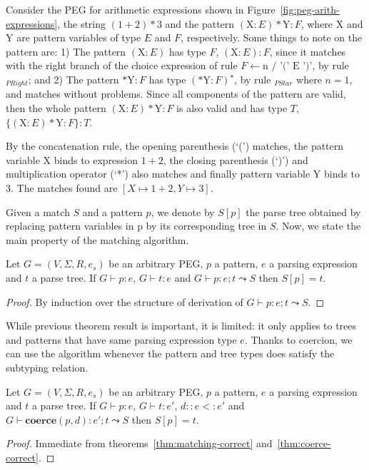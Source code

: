 \begin{example}
  Consider the PEG for arithmetic expressions shown in Figure~\ref{fig:peg-arith-expressions}, 
  the string \((1+2)*3\) and the pattern \((\text{X}:E)*\text{Y}:F\), where X 
  and Y are pattern variables of type \(E\) and \(F\), respectively. 
  Some things to note on the pattern are: 
  1) The pattern \((\text{X}:E)\) has type \(F\), \((\text{X}:E):F\), since it 
  matches with the right branch of the choice expression of rule 
  \(F \leftarrow \text{n / '(' E ')'}\), by rule \(_{PRight}\); and
  2) The pattern \(* \text{Y}:F\) has type \((* \text{Y}:F)^\star\), by rule 
  \(_{PStar}\) where \(n = 1\), and matches without problems.
  Since all components of the pattern are valid, then the whole pattern 
  \((\text{X}:E)*\text{Y}:F\) is also valid and has type \(T\),
  \(\{(\text{X}:E)*\text{Y}:F\}:T\).

  By the concatenation rule, the opening parenthesis (`(') matches, the pattern 
  variable X binds to expression \(1+2\), the closing parenthesis (`)') and 
  multiplication operator (`*') also matches and finally pattern variable Y 
  binds to \(3\).
  The matches found are \([X \mapsto 1+2, Y \mapsto 3]\).
\end{example}

Given a match $S$ and a pattern $p$, we denote by $S[p]$ the parse tree
obtained by replacing pattern variables in p by its corresponding tree
in $S$. Now, we state the main property of the matching algorithm.

\begin{theorem}\label{thm:matching-correct}
  Let $G = (V,\Sigma,R, e_s)$ be an arbitrary PEG, $p$ a pattern,
  $e$ a parsing expression and $t$ a parse tree. If $G \vdash p : e$, $G \vdash t : e$ and
  $G\vdash p : e ; t \leadsto S$ then $S[p] = t$.
\end{theorem}
\begin{proof}
  By induction over the structure of derivation of $G\vdash p : e ; t \leadsto S$.
\end{proof}

While previous theorem result is important, it is limited: it only applies to
trees and patterns that have same parsing expression type $e$. Thanks to coercion,
we can use the algorithm whenever the pattern and tree types does satisfy the
subtyping relation.

\begin{corollary}
Let $G = (V,\Sigma,R, e_s)$ be an arbitrary PEG, $p$ a pattern,
$e$ a parsing expression and $t$ a parse tree. If $G \vdash p : e$, $G \vdash t : e'$,
  $d :: e <: e'$ and $G\vdash \mathbf{coerce}(p,d) : e' ; t \leadsto S$ then $S[p] = t$.
\end{corollary}
\begin{proof}
  Immediate from theorems~\ref{thm:matching-correct} and~\ref{thm:coerce-correct}.
\end{proof}

